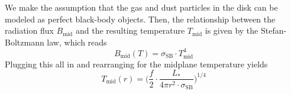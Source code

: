     We make the assumption that the gas and dust particles in the disk can be modeled as perfect 
    black-body objects. 
    Then, the relationship between the radiation flux $B_\text{mid}$
    and the resulting temperature $T_\text{mid}$ 
    is given by the Stefan-Boltzmann law, which reads
    \begin{equation}
        \label{eq:stefan_boltzmann_law}
        B_\text{mid}(T) = \sigma_\text{SB} \cdot T_\text{mid}^4
    \end{equation}
    Plugging this all in and rearranging for the midplane temperature yields
    \begin{equation}
        \boxed{T_\text{mid}(r) = \bigg( \frac{f}{2} \cdot \frac{L_*}{4\pi r^2 \cdot
        \sigma_\text{SB}} \bigg)^{1/4}}
    \end{equation}



    
